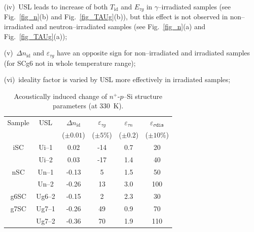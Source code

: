 \documentclass[aip,jap, amsmath,amssymb,reprint]{revtex4-1}
\begin{document}
\noindent
(iv)~USL leads to increase  of both $T_{\mathrm{id}}$ and $E_{\tau g}$ in $\gamma$--irradiated samples (see Fig.~\ref{fig_n}(b) and Fig.~\ref{fig_TAUg}(b)),
but this effect is not observed in non--irradiated and neutron--irradiated samples (see Fig.~\ref{fig_n}(a) and Fig.~\ref{fig_TAUg}(a));

\noindent
(v)~$\Delta n_{\mathrm{id}}$ and $\varepsilon_{\tau g}$ have an opposite sign for non--irradiated and irradiated samples
(for SCg6 not in whole temperature range);

\noindent
(vi)~ideality factor is varied by USL more effectively in irradiated samples;


\begin{table}
\caption{\label{tabAIchange}Acoustically induced change of $n^+$-$p$--Si structure parameters (at 330~K).
}
\begin{ruledtabular}
\begin{tabular}{cccccc}
Sample&USL&$\Delta n_{\mathrm{id}}$ &$\varepsilon_{\tau g}$ &$\varepsilon_{\tau n}$ &$\varepsilon_{\sigma\mathtt{dis}}$ \\
&&\mbox{($\pm0.01$)}&($\pm5$\%)&($\pm0.2$)&($\pm10$\%)\\
\hline
iSC&Ui--1&0.02&-14&0.7&20\\
&Ui--2&0.03&-17&1.4&40\\
nSC&Un--1&-0.13&5&1.5&50\\
&Un--2&-0.26&13&3.0&100\\
g6SC&Ug6--2&-0.15&2&2.3&30\\
g7SC&Ug7--1&-0.26&49&0.9&70\\
&Ug7--2&-0.36&70&1.9&110\\
\end{tabular}
\end{ruledtabular}
\end{table}
\end{document}
